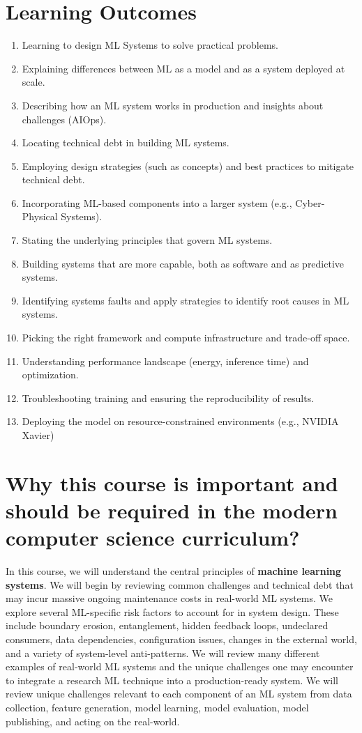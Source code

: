 \documentclass[11pt]{article}
\begin{document}
\section*{Learning Outcomes}
\begin{enumerate}
\item Learning to design ML Systems to solve practical problems.
\item Explaining differences between ML as a model and as a system deployed at scale.
\item Describing how an ML system works in production and insights about challenges (AIOps).
\item Locating technical debt in building ML systems.
\item Employing design strategies (such as concepts) and best practices to mitigate technical debt.
\item Incorporating ML-based components into a larger system (e.g., Cyber-Physical Systems).
\item Stating the underlying principles that govern ML systems.
\item Building systems that are more capable, both as software and as predictive systems.
\item Identifying systems faults and apply strategies to identify root causes in ML systems.
\item Picking the right framework and compute infrastructure and trade-off space.
\item Understanding performance landscape (energy, inference time) and optimization.
\item Troubleshooting training and ensuring the reproducibility of results.
\item Deploying the model on resource-constrained environments (e.g., NVIDIA Xavier)

\end{enumerate}


\section*{Why this course is important and should be required in the modern computer science curriculum?}

In this course, we will understand the central principles of \textbf{machine learning systems}. We will begin by reviewing common challenges and technical debt that may incur massive ongoing maintenance costs in real-world ML systems. We explore several ML-specific risk factors to account for in system design. These include boundary erosion, entanglement, hidden feedback loops, undeclared consumers, data dependencies, configuration issues, changes in the external world, and a variety of system-level anti-patterns. We will review many different examples of real-world ML systems and the unique challenges one may encounter to integrate a research ML technique into a production-ready system. We will review unique challenges relevant to each component of an ML system from data collection, feature generation, model learning, model evaluation, model publishing, and acting on the real-world. 
\end{document}
